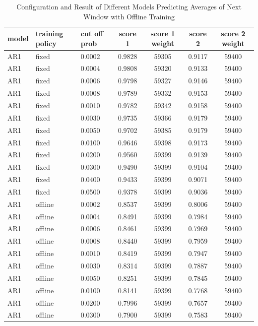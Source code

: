 \documentclass{article}
\begin{document}
\begin{longtable}[htbp]{l|l|l|*{4}{c}}
  \caption{Configuration and Result of Different Models Predicting Averages of Next Window with Offline Training}
  \label{tab:tab1.10.1}\\
  \textbf{model} & \textbf{training policy} & \textbf{cut off prob} &
  \textbf{score 1} & \textbf{score 1 weight} & \textbf{score 2} & \textbf{score
  2 weight} \\
  \hline
  AR1 & fixed & 0.0002 & 0.9828 & 59305 & 0.9117 & 59400\\
  AR1 & fixed & 0.0004 & 0.9808 & 59320 & 0.9133 & 59400\\
  AR1 & fixed & 0.0006 & 0.9798 & 59327 & 0.9146 & 59400\\
  AR1 & fixed & 0.0008 & 0.9789 & 59332 & 0.9153 & 59400\\
  AR1 & fixed & 0.0010 & 0.9782 & 59342 & 0.9158 & 59400\\
  AR1 & fixed & 0.0030 & 0.9735 & 59366 & 0.9179 & 59400\\
  AR1 & fixed & 0.0050 & 0.9702 & 59385 & 0.9179 & 59400\\
  AR1 & fixed & 0.0100 & 0.9646 & 59398 & 0.9173 & 59400\\
  AR1 & fixed & 0.0200 & 0.9560 & 59399 & 0.9139 & 59400\\
  AR1 & fixed & 0.0300 & 0.9490 & 59399 & 0.9104 & 59400\\
  AR1 & fixed & 0.0400 & 0.9433 & 59399 & 0.9071 & 59400\\
  AR1 & fixed & 0.0500 & 0.9378 & 59399 & 0.9036 & 59400\\
  AR1 & offline & 0.0002 & 0.8537 & 59399 & 0.8006 & 59400\\
  AR1 & offline & 0.0004 & 0.8491 & 59399 & 0.7984 & 59400\\
  AR1 & offline & 0.0006 & 0.8461 & 59399 & 0.7969 & 59400\\
  AR1 & offline & 0.0008 & 0.8440 & 59399 & 0.7959 & 59400\\
  AR1 & offline & 0.0010 & 0.8419 & 59399 & 0.7947 & 59400\\
  AR1 & offline & 0.0030 & 0.8314 & 59399 & 0.7887 & 59400\\
  AR1 & offline & 0.0050 & 0.8251 & 59399 & 0.7845 & 59400\\
  AR1 & offline & 0.0100 & 0.8141 & 59399 & 0.7768 & 59400\\
  AR1 & offline & 0.0200 & 0.7996 & 59399 & 0.7657 & 59400\\
  AR1 & offline & 0.0300 & 0.7900 & 59399 & 0.7583 & 59400\\

\end{longtable}
\end{document}
